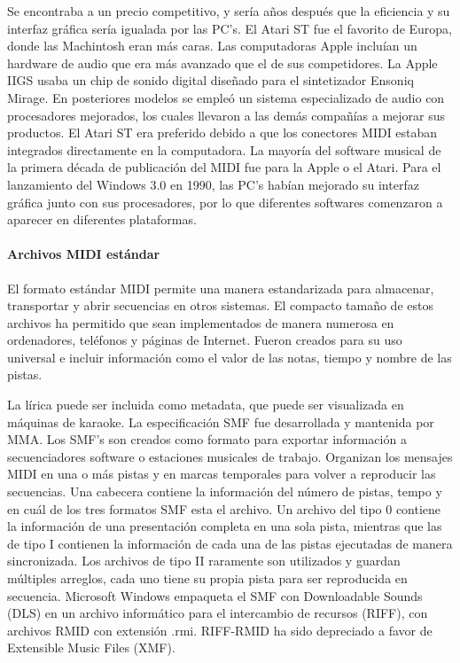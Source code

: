 \documentclass[a4paper,11pt,oneside]{book}
\begin{document}
Se encontraba a un precio competitivo, y sería años después que la eficiencia y su interfaz gráfica sería igualada por las PC's. El Atari ST fue el favorito de Europa, donde las Machintosh eran más caras. Las computadoras Apple incluían un hardware de audio que era más avanzado que el de sus competidores. La Apple IIGS usaba un chip de sonido digital diseñado para el sintetizador Ensoniq Mirage.
En posteriores modelos se empleó un sistema especializado de audio con procesadores mejorados, los cuales llevaron a las demás compañías a mejorar sus productos. El Atari ST era preferido debido a que los conectores MIDI estaban integrados directamente en la computadora. La mayoría del software musical de la primera década de publicación del MIDI fue para la Apple o el Atari. Para el lanzamiento del Windows 3.0 en 1990, las PC's habían mejorado su interfaz gráfica junto con sus procesadores, por lo que diferentes softwares comenzaron a aparecer en diferentes plataformas.


\paragraph{Archivos MIDI estándar}


El formato estándar MIDI permite una manera estandarizada para almacenar, transportar y abrir secuencias en otros sistemas. El compacto tamaño de estos archivos ha permitido que sean implementados de manera numerosa en ordenadores, teléfonos y páginas de Internet.
Fueron creados para su uso universal e incluir información como el valor de las notas, tiempo y nombre de las pistas.

La lírica puede ser incluida como metadata, que puede ser visualizada en máquinas de karaoke. La especificación SMF fue desarrollada y mantenida por MMA. Los SMF's son creados como formato para exportar información a secuenciadores software o estaciones musicales de trabajo. Organizan los mensajes MIDI en una o más pistas y en marcas temporales para volver a reproducir las secuencias. Una cabecera contiene la información del número de pistas, tempo y en cuál de los tres formatos SMF esta el archivo. Un archivo del tipo 0 contiene la información de una presentación completa en una sola pista, mientras que las de tipo I contienen la información de cada una de las pistas ejecutadas de manera sincronizada. Los archivos de tipo II raramente son utilizados y guardan múltiples arreglos, cada uno tiene su propia pista para ser reproducida en secuencia.
Microsoft Windows empaqueta el SMF con Downloadable Sounds (DLS) en un archivo informático para el intercambio de recursos (RIFF), con archivos RMID con extensión .rmi. RIFF-RMID ha sido depreciado a favor de Extensible Music Files (XMF).
\end{document}
